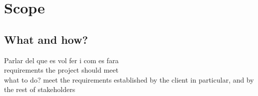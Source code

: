 \chapter{Scope} %

\label{Chapter3} %

\section{What and how?}

Parlar del que es vol fer i com es fara
\\
requirements the project should meet\\
what to do? meet the requirements established by the client in particular, and by the rest of stakeholders


